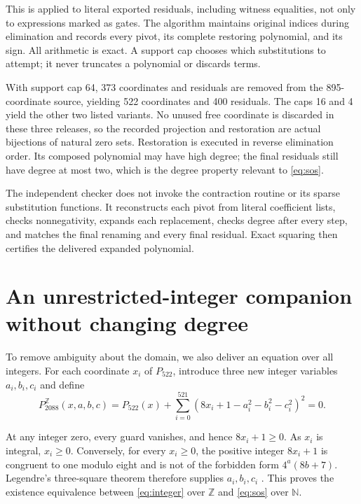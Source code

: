 \documentclass[11pt,letterpaper]{article}
\theoremstyle{definition}\newtheorem{definition}[theorem]{Definition}
\theoremstyle{remark}\newtheorem{remark}[theorem]{Remark}
\newcommand{\N}{\mathbb N}
\newcommand{\Z}{\mathbb Z}
\newcommand{\pn}{P_{522}}
\newcommand{\pz}{P^{\Z}_{2088}}
\begin{document}
This is applied to literal exported residuals, including witness
equalities, not only to expressions marked as gates. The algorithm
maintains original indices during elimination and records every pivot,
its complete restoring polynomial, and its sign. All arithmetic is
exact. A support cap chooses which substitutions to attempt; it never
truncates a polynomial or discards terms.

With support cap 64, 373 coordinates and residuals are removed from the
895-coordinate source, yielding 522 coordinates and 400 residuals. The
caps 16 and 4 yield the other two listed variants. No unused free
coordinate is discarded in these three releases, so the recorded
projection and restoration are actual bijections of natural zero sets.
Restoration is executed in reverse elimination order. Its composed
polynomial may have high degree; the final residuals still have degree
at most two, which is the degree property relevant to \eqref{eq:sos}.

The independent checker does not invoke the contraction routine or its
sparse substitution functions. It reconstructs each pivot from literal
coefficient lists, checks nonnegativity, expands each replacement, checks
degree after every step, and matches the final renaming and every final
residual. Exact squaring then certifies the delivered expanded polynomial.

\section{An unrestricted-integer companion without changing degree}
\label{sec:integers}

To remove ambiguity about the domain, we also deliver an equation over
all integers. For each coordinate $x_i$ of $\pn$, introduce three new
integer variables $a_i,b_i,c_i$ and define
\begin{equation}\label{eq:integer}
 \boxed{\displaystyle
 \pz(x,a,b,c)=\pn(x)+
 \sum_{i=0}^{521}(8x_i+1-a_i^2-b_i^2-c_i^2)^2=0.}
\end{equation}

At any integer zero, every guard vanishes, and hence $8x_i+1\ge0$.
As $x_i$ is integral, $x_i\ge0$. Conversely, for every $x_i\ge0$,
the positive integer $8x_i+1$ is congruent to one modulo eight and is
not of the forbidden form $4^a(8b+7)$. Legendre's three-square theorem
therefore supplies $a_i,b_i,c_i$ \cite{threesquares}. This proves the
existence equivalence between \eqref{eq:integer} over $\Z$ and
\eqref{eq:sos} over $\N$.
\end{document}
